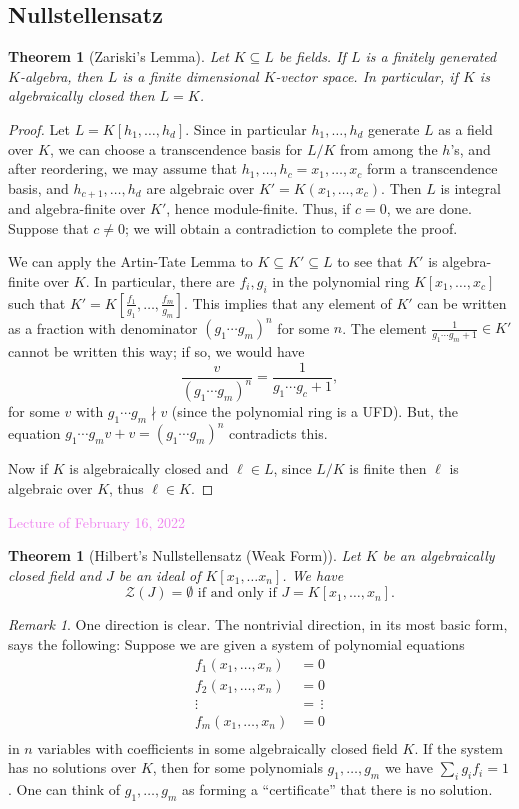 \documentclass{amsart}[12pt]
\newcommand{\Feb}[1]{\textcolor{violet}{Lecture of February #1, 2022}}
\newcommand{\cZ}{\mathcal{Z}}
\numberwithin{equation}{section}
\theoremstyle{plain} %
\newtheorem{thm}[equation]{Theorem}
\theoremstyle{definition}
\theoremstyle{remark}
\newtheorem{rem}[equation]{Remark}
\newcommand{\ssec}[1]{\subsection{#1}}
\begin{document}
\ssec{Nullstellensatz}

\begin{thm}[Zariski's Lemma]
\label{lem:Zariski}
 Let $K\subseteq L$ be fields. If $L$ is a finitely generated $K$-algebra, then $L$ is a finite dimensional $K$-vector space. In particular, if $K$ is algebraically closed then $L=K$.
\end{thm}
\begin{proof}
	Let $L=K[h_1,\dots,h_d]$. Since in particular $h_1,\dots,h_d$ generate $L$ as a field over $K$, we can choose a transcendence basis for $L/K$ from among the $h$'s, and after reordering, we may assume that $h_1,\dots,h_c=x_1,\dots,x_c$ form a transcendence basis, and $h_{c+1},\dots,h_d$ are algebraic over $K'=K(x_1,\dots,x_c)$. Then $L$ is integral and algebra-finite over $K'$, hence module-finite. Thus, if $c=0$, we are done. Suppose that $c\neq 0$; we will obtain a contradiction to complete the proof.

 We can apply the Artin-Tate Lemma to $K\subseteq K' \subseteq L$ to see that $K'$ is algebra-finite over $K$. In particular, there are $f_i, g_i$ in the polynomial ring $K[x_1,\dots,x_c]$ such that $K'=K[\frac{f_1}{g_1},\dots,\frac{f_m}{g_m}]$. This implies that any element of $K'$ can be written as a fraction with denominator $(g_1\cdots g_m)^n$ for some $n$.  The element $\frac{1}{g_1\cdots g_m +1}\in K'$ cannot be written this way; if so, we would have 
	\[  \frac{v}{(g_1\cdots g_m)^n} = \frac{1}{g_1\cdots g_c +1},\]
	for some $v$ with $g_1\cdots g_m \nmid v$ (since the polynomial ring is a UFD). But, the equation $g_1\cdots g_m v + v = (g_1\cdots g_m)^n$ contradicts this.
	
Now if $K$ is algebraically closed and $\ell \in L$, since $L/K$ is finite then $\ell$ is algebraic over $K$,  thus $\ell\in K$.
\end{proof}

\Feb{16}


\begin{thm}[Hilbert's Nullstellensatz (Weak Form)]
Let $K$ be an algebraically closed field and  $J$ be an ideal of $K[x_1, \dots x_n]$. We have 
\[\cZ(J) =\emptyset \text{ if and only if } J = K[x_1, \dots, x_n].\]
\end{thm}

\begin{rem} One direction is clear. The nontrivial direction, in its most basic form, says the following: Suppose we are given a system of polynomial equations
\[
\begin{aligned}
f_1(x_1, \dots, x_n) & = 0 \\
f_2(x_1, \dots, x_n) & = 0 \\
\vdots \qquad &  = \, \vdots \\
f_m(x_1, \dots, x_n) & = 0 \\
\end{aligned}
\]
in $n$ variables with coefficients in some algebraically closed field $K$.  If the system has no solutions over $K$, then for some polynomials $g_1,\dots, g_m$ we have $\sum_i g_i f_i = 1$. One can think of $g_1,\dots,g_m$ as forming a ``certificate'' that there is no solution.
\end{rem}
\end{document}
